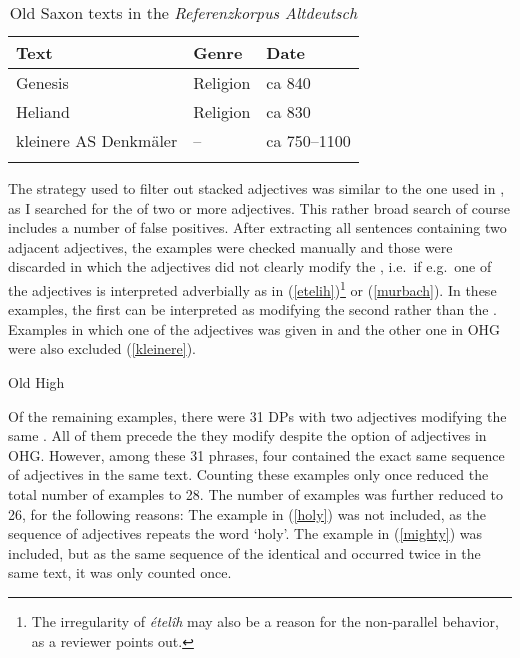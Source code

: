\documentclass[output=paper,colorlinks,citecolor=brown]{langscibook}
\begin{document}
\begin{table}
    \begin{tabular}{lll}
    \lsptoprule 
     Text  & Genre & Date \\
     \midrule 
     Genesis & Religion & ca 840\\
     Heliand & Religion & ca 830\\
     kleinere AS Denkmäler & -- & ca 750--1100\\
     \lspbottomrule 
    \end{tabular}
    \caption{Old Saxon texts in the \textit{Referenzkorpus Altdeutsch}}
    \label{tab:os-texts}
\end{table}


The strategy used to filter out stacked adjectives was similar to the one used in \citet{Bech17}, as I searched for the  of two or more adjectives. This rather broad search of course includes a number of false positives. After extracting all sentences containing two adjacent adjectives, the examples were checked manually and those were discarded in which the adjectives did not clearly modify the , i.e.~if e.g.~one of the adjectives is interpreted adverbially as in (\ref{etelih})\footnote{The irregularity of \textit{étel{\^i}h} may also be a reason for the non-parallel behavior, as a reviewer points out.} or (\ref{murbach}). In these examples, the first  can be interpreted as modifying the second  rather than the . Examples in which one of the adjectives was given in  and the other one in OHG were also excluded (\ref{kleinere}).


\ea Old High 

\z
\z 

Of the remaining examples, there were 31 DPs with two  adjectives modifying the same . All of them precede the  they modify despite the option of   adjectives in OHG. However, among these 31  phrases, four contained the exact same sequence of adjectives in the same text. Counting these examples only once reduced the total number of examples to 28. The number of examples was further reduced to 26, for the following reasons: The example in (\ref{holy}) was not included, as the sequence of adjectives repeats the word ‘holy’. The example in (\ref{mighty}) was included, but as the same sequence of the identical  and   occurred twice in the same text, it was only counted once.
\end{document}
